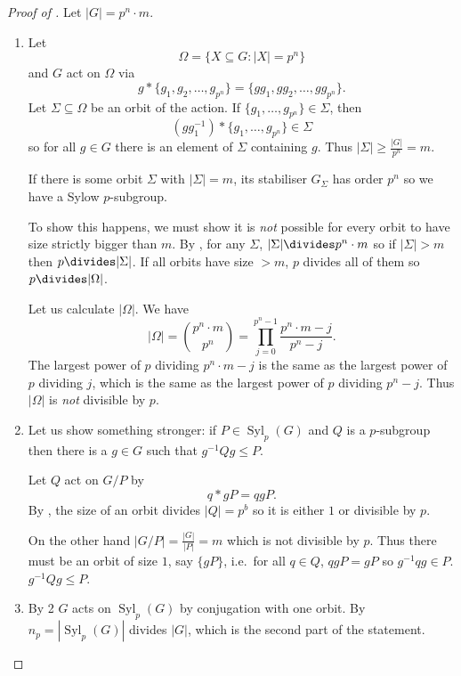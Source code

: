\documentclass[a4paper]{article}
\theoremstyle{definition}
\DeclareMathOperator{\syl}{Syl}
\begin{document}
\begin{proof}[Proof of ]
  Let \(|G| = p^n \cdot m\).
  \begin{enumerate}
  \item Let
    \[
      \Omega = \{X \subseteq G: |X| = p^n\}
    \]
    and \(G\) act on \(\Omega\) via
    \[
      g * \{g_1, g_2, \dots, g_{p^n}\} = \{gg_1, gg_2, \dots, gg_{p^n}\}.
    \]
    Let \(\Sigma \subseteq \Omega\) be an orbit of the action. If \(\{g_1, \dots, g_{p^n}\} \in \Sigma\), then
    \[
      (gg_1^{-1}) * \{g_1, \dots, g_{p^n}\} \in \Sigma
    \]
    so for all \(g \in G\) there is an element of \(\Sigma\) containing \(g\). Thus \(|\Sigma| \geq \frac{|G|}{p^n} = m\).

    If there is some orbit \(\Sigma\) with \(|\Sigma| = m\), its stabiliser \(G_\Sigma\) has order \(p^n\) so we have a Sylow \(p\)-subgroup.

    To show this happens, we must show  it is \emph{not} possible for every orbit to have size strictly bigger than \(m\). By , for any \(\Sigma\), \(|\Sigma| \divides p^n \cdot m\) so if \(|\Sigma| > m\) then \(p \divides |\Sigma|\). If all orbits have size \(> m\), \(p\) divides all of them so \(p \divides |\Omega|\).

    Let us calculate \(|\Omega|\). We have
    \[
      |\Omega| = \binom{p^n \cdot m}{p^n} = \prod_{j = 0}^{p^n - 1} \frac{p^n \cdot m - j}{p^n - j}.
    \]
    The largest power of \(p\) dividing \(p^n \cdot m - j\) is the same as the largest power of \(p\) dividing \(j\), which is the same as the largest power of \(p\) dividing \(p^n - j\). Thus \(|\Omega|\) is \emph{not} divisible by \(p\).
  \item Let us show something stronger: if \(P \in \syl_p(G)\) and \(Q\) is a \(p\)-subgroup then there is a \(g \in G\) such that \(g^{-1}Qg \leq P\).

    Let \(Q\) act on \(G/P\) by
    \[
      q * gP = qgP.
    \]
    By , the size of an orbit divides \(|Q| = p^b\) so it is either \(1\) or divisible by \(p\).

    On the other hand \(|G/P| = \frac{|G|}{|P|} = m\) which is not divisible by \(p\). Thus there must be an orbit of size \(1\), say \(\{gP\}\), i.e.\ for all \(q \in Q\), \(qgP = gP\) so \(g^{-1}qg \in P\). \(g^{-1}Qg \leq P\).
  \item By 2 \(G\) acts on \(\syl_p(G)\) by conjugation with one orbit. By  \(n_p = |\syl_p(G)|\) divides \(|G|\), which is the second part of the statement.


\end{enumerate}
\end{proof}
\end{document}
